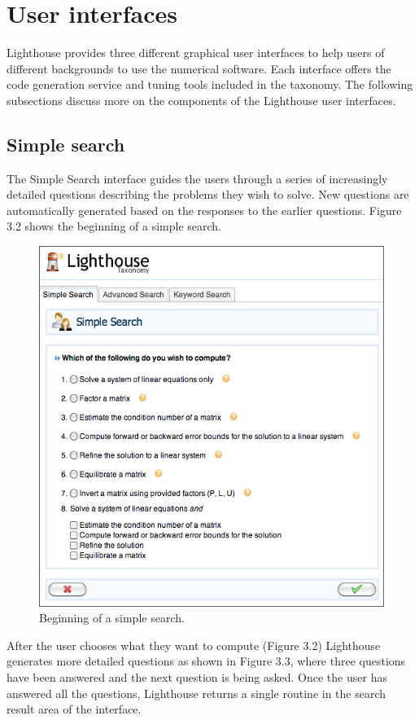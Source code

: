 \section{User interfaces}
Lighthouse provides three different graphical user interfaces to help users of different backgrounds to use the numerical software. Each interface offers the code generation service and tuning tools included in the taxonomy. The following subsections discuss more on the components of the Lighthouse user interfaces.

\subsection{Simple search}
The Simple Search interface guides the users through a series of increasingly detailed questions describing the problems they wish to solve. New questions are automatically generated based on the responses to the earlier questions. Figure 3.2 shows the beginning of a simple search.

\begin{figure}[h!]\label{simplesearch1}
  \centering
  \includegraphics[width=5in]{figs/simplesearch1}
  \caption[Beginning of a simple search]
   {Beginning of a simple search.}
\end{figure}

\noindent After the user chooses what they want to compute (Figure 3.2) Lighthouse generates more detailed questions as shown in Figure 3.3, where three questions have been answered and the next question is being asked. Once the user has answered all the questions, Lighthouse returns a single routine in the search result area of the interface.

